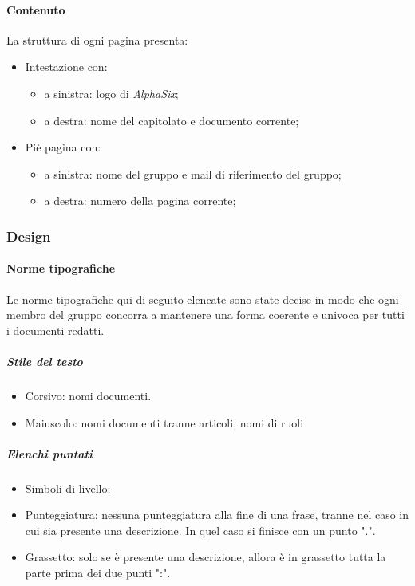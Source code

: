 			\paragraph{Contenuto}\label{PS:Documentazione:Struttura:Contenuto}
			La struttura di ogni pagina presenta:
			\begin{itemize}
				\item Intestazione con:
				\begin{itemize}
					\item a sinistra: logo di \textit{AlphaSix};
					\item a destra: nome del capitolato e documento corrente;
				\end{itemize}
				\item Piè pagina con:
				\begin{itemize}
					\item a sinistra: nome del gruppo e mail di riferimento del gruppo;
					\item a destra: numero della pagina corrente;
				\end{itemize}
			\end{itemize}


		\subsubsection{Design}\label{PS:Documentazione:Design}

			\paragraph{Norme tipografiche}\label{PS:Documentazione:Design:NormeT}
			Le norme tipografiche qui di seguito elencate sono state decise in modo che ogni membro del gruppo concorra a mantenere una forma coerente e univoca per tutti i documenti redatti.

			\subparagraph{Stile del testo}\label{PS:Documentazione:Design:NormeT:StileTesto}
			\begin{itemize}
				\item Corsivo: nomi documenti.
				\item Maiuscolo: nomi documenti tranne articoli, nomi di ruoli
			\end{itemize}

			\subparagraph{Elenchi puntati}\label{PS:Documentazione:Design:NormeT:ElenchiPuntati}
			\begin{itemize}
				\item Simboli di livello:
				\item Punteggiatura: nessuna punteggiatura alla fine di una frase, tranne nel caso in cui sia presente una descrizione. In quel caso si finisce con un punto ".".
				\item Grassetto: solo se è presente una descrizione, allora è in grassetto tutta la parte prima dei due punti ":".
			\end{itemize}

